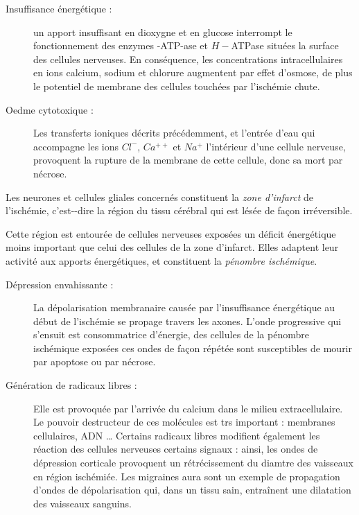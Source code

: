 \begin{description}
\item[Insuffisance \'energ\'etique :] un apport insuffisant en dioxygne et en glucose %
interrompt le fonctionnement des enzymes -ATP-ase et $H-$ATPase situ\'ees  la surface des cellules nerveuses. %
En cons\'equence, les concentrations intracellulaires en ions calcium, sodium et chlorure augmentent par effet d'osmose, %
de plus le potentiel de membrane des cellules touch\'ees par l'isch\'emie chute.
\item[Oedme cytotoxique :] Les transferts ioniques d\'ecrits pr\'ec\'edemment, et l'entr\'ee d'eau qui accompagne les ions $Cl^-$, %
$Ca^{++}$ et $Na^+$  l'int\'erieur d'une cellule nerveuse, provoquent la rupture de la membrane de cette cellule, donc sa mort par n\'ecrose.
\end{description}

Les neurones et cellules gliales concern\'es constituent la \emph{zone d'infarct} de l'isch\'emie, %
c'est--dire la r\'egion du tissu c\'er\'ebral qui est l\'es\'ee de fa\c con irr\'eversible.

\par
Cette r\'egion est entour\'ee de cellules nerveuses expos\'ees  %
un d\'eficit \'energ\'etique moins important que celui des cellules de la zone d'infarct. %
Elles adaptent leur activit\'e aux apports \'energ\'etiques, et constituent la \emph{p\'enombre isch\'emique}.

\begin{description}
\item[D\'epression envahissante :] La d\'epolarisation membranaire caus\'ee par l'insuffisance \'energ\'etique au d\'ebut de l'isch\'emie se propage  travers les axones. %
L'onde progressive qui s'ensuit est consommatrice d'\'energie, des cellules de la p\'enombre isch\'emique expos\'ees  ces ondes de fa\c con r\'ep\'et\'ee %
sont susceptibles de mourir par apoptose ou par n\'ecrose.
\item[G\'en\'eration de radicaux libres :] Elle est provoqu\'ee par l'arriv\'ee du calcium dans le milieu extracellulaire. %
Le pouvoir destructeur de ces mol\'ecules est trs important : membranes cellulaires, ADN \dots %
Certains radicaux libres modifient \'egalement les r\'eaction des cellules nerveuses  certains signaux :
ainsi, les ondes de d\'epression corticale provoquent un r\'etr\'ecissement du diamtre des vaisseaux en r\'egion isch\'emi\'ee. %
Les migraines  aura sont un exemple de propagation d'ondes de d\'epolarisation qui, dans un tissu sain, entra\^inent une dilatation des vaisseaux sanguins.
\end{description}

